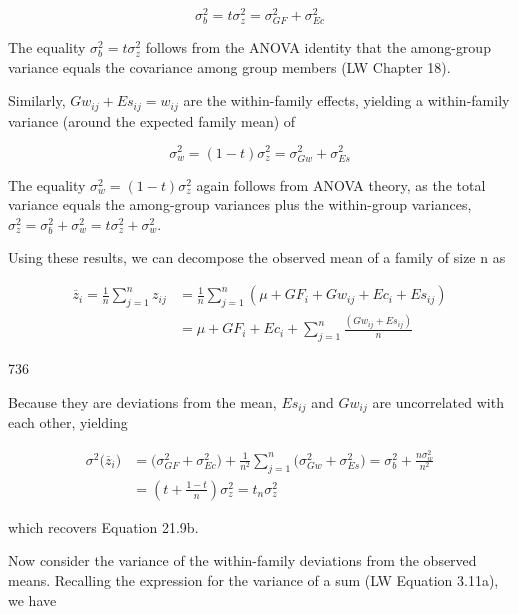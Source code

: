 \documentclass{article}
\begin{document}
\begin{equation}
\sigma_{b}^{2}=t\sigma_{z}^{2}=\sigma_{G F}^{2}+\sigma_{E c}^{2}
\end{equation}

The equality  $ \sigma_b^2 = t\sigma_z^2 $ follows from the ANOVA identity that the among-group variance equals the covariance among group members (LW Chapter 18).

Similarly,  $ Gw_{ij} + Es_{ij} = w_{ij} $ are the within-family effects, yielding a within-family variance (around the expected family mean) of

\begin{equation}
\sigma_{w}^{2}=(1-t)\sigma_{z}^{2}=\sigma_{G w}^{2}+\sigma_{E s}^{2}
\end{equation}

The equality  $ \sigma_{w}^{2} = (1 - t) \sigma_{z}^{2} $ again follows from ANOVA theory, as the total variance equals the among-group variances plus the within-group variances,  $ \sigma_{z}^{2} = \sigma_{b}^{2} + \sigma_{w}^{2} = t \sigma_{z}^{2} + \sigma_{w}^{2} $.

Using these results, we can decompose the observed mean of a family of size n as

\begin{equation}
\begin{aligned}\overline{z}_{i}=\frac{1}{n}\sum_{j=1}^{n}z_{ij}&=\frac{1}{n}\sum_{j=1}^{n}\left(\mu+GF_{i}+Gw_{ij}+Ec_{i}+Es_{ij}\right)\\&=\mu+GF_{i}+Ec_{i}+\sum_{j=1}^{n}\frac{\left(Gw_{ij}+Es_{ij}\right)}{n}\end{aligned}
\end{equation}

736

Because they are deviations from the mean,  $ Es_{ij} $ and  $ Gw_{ij} $ are uncorrelated with each other, yielding

\begin{equation}
\begin{aligned}\sigma^{2}\big(\overline{z}_{i}\big)&=\big(\sigma_{GF}^{2}+\sigma_{Ec}^{2}\big)+\frac{1}{n^{2}}\sum_{j=1}^{n}\big(\sigma_{Gw}^{2}+\sigma_{Es}^{2}\big)=\sigma_{b}^{2}+\frac{n\sigma_{w}^{2}}{n^{2}}\\&=\left(t+\frac{1-t}{n}\right)\sigma_{z}^{2}=t_{n}\sigma_{z}^{2}\end{aligned}
\end{equation}

which recovers Equation 21.9b.

Now consider the variance of the within-family deviations from the observed means. Recalling the expression for the variance of a sum (LW Equation 3.11a), we have
\end{document}
